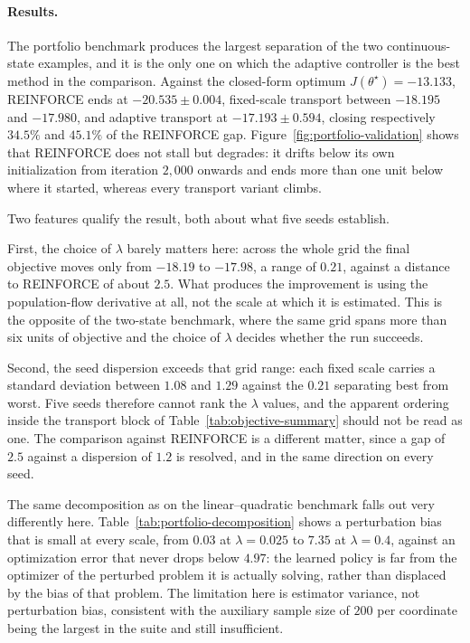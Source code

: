 \paragraph{Results.}
The portfolio benchmark produces the largest separation of the two continuous-state examples, and it is the only one on which the adaptive controller is the best method in the comparison. Against the closed-form optimum $J(\theta^\star)=-13.133$, REINFORCE ends at $-20.535\pm0.004$, fixed-scale transport between $-18.195$ and $-17.980$, and adaptive transport at $-17.193\pm0.594$, closing respectively $34.5\%$ and $45.1\%$ of the REINFORCE gap. Figure~\ref{fig:portfolio-validation} shows that REINFORCE does not stall but degrades: it drifts below its own initialization from iteration $2{,}000$ onwards and ends more than one unit below where it started, whereas every transport variant climbs.


Two features qualify the result, both about what five seeds establish.

First, the choice of $\lambda$ barely matters here: across the whole grid the final objective moves only from $-18.19$ to $-17.98$, a range of $0.21$, against a distance to REINFORCE of about $2.5$. What produces the improvement is using the population-flow derivative at all, not the scale at which it is estimated. This is the opposite of the two-state benchmark, where the same grid spans more than six units of objective and the choice of $\lambda$ decides whether the run succeeds.

Second, the seed dispersion exceeds that grid range: each fixed scale carries a standard deviation between $1.08$ and $1.29$ against the $0.21$ separating best from worst. Five seeds therefore cannot rank the $\lambda$ values, and the apparent ordering inside the transport block of Table~\ref{tab:objective-summary} should not be read as one. The comparison against REINFORCE is a different matter, since a gap of $2.5$ against a dispersion of $1.2$ is resolved, and in the same direction on every seed.

The same decomposition as on the linear--quadratic benchmark falls out very differently here. Table~\ref{tab:portfolio-decomposition} shows a perturbation bias that is small at every scale, from $0.03$ at $\lambda=0.025$ to $7.35$ at $\lambda=0.4$, against an optimization error that never drops below $4.97$: the learned policy is far from the optimizer of the perturbed problem it is actually solving, rather than displaced by the bias of that problem. The limitation here is estimator variance, not perturbation bias, consistent with the auxiliary sample size of $200$ per coordinate being the largest in the suite and still insufficient.

